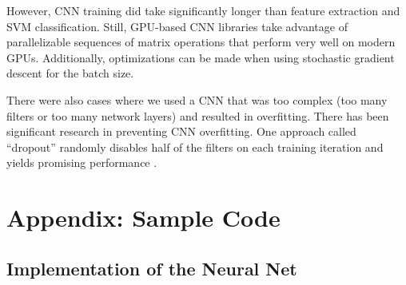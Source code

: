 \documentclass[10pt,twocolumn]{article}
\begin{document}
However, CNN training did take significantly longer than feature extraction and SVM classification. Still, GPU-based CNN libraries take advantage of parallelizable sequences of matrix operations that perform very well on modern GPUs. Additionally, optimizations can be made when using stochastic gradient descent for the batch size.

There were also cases where we used a CNN that was too complex (too many filters or too many network layers) and resulted in overfitting. There has been significant research in preventing CNN overfitting. One approach called ``dropout'' randomly disables half of the filters on each training iteration and yields promising performance \cite{dropout}.

\section{Appendix: Sample Code}

\subsection{Implementation of the Neural Net}

{}

\end{document}
